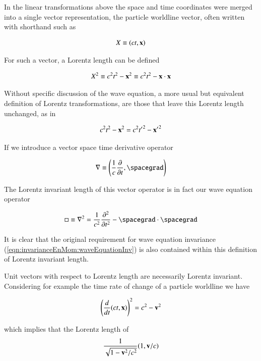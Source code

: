 In the linear transformations above the space and time coordinates were merged into a single vector representation,
the particle worldline vector, often written with shorthand such as

\begin{align}
X \equiv (ct, \mathbf{x})
\end{align}

For such a vector, a Lorentz length can be defined

\begin{align}
X^2 \equiv c^2 t^2 - \mathbf{x}^2 \equiv c^2 t^2 - \mathbf{x} \cdot \mathbf{x}
\end{align}

Without specific discussion of the wave equation, 
a more usual but equivalent definition of Lorentz transformations, are those that leave this
Lorentz length unchanged, as in

\begin{align}
c^2 t^2 - \mathbf{x}^2 = c^2 {t'}^2 - {\mathbf{x}'}^2 
\end{align}

If we introduce a vector space time derivative operator

\begin{align}
\grad \equiv \left(\inv{c}\frac{\partial}{\partial t}, \spacegrad \right)
\end{align}

The Lorentz invariant length of this vector operator is in fact our wave equation operator

\begin{align}
\square \equiv \grad^2 = \inv{c^2}\frac{\partial^2}{\partial t^2} - \spacegrad \cdot \spacegrad
\end{align}

It is clear that the original requirement for wave equation invariance (\ref{eqn:invarianceEnMom:waveEquationInv}) is also contained within 
this definition of Lorentz invariant length.

Unit vectors with respect to Lorentz length are necessarily Lorentz invariant.  Considering for example the time rate of change of
a particle worldline we have

\begin{align}
\left(\frac{d}{dt}(ct, \mathbf{x}) \right)^2 = c^2 - \mathbf{v}^2
\end{align}

which implies that the Lorentz length of
\begin{align}
\frac{1}{\sqrt{1 - \mathbf{v}^2/c^2}}(1, \mathbf{v}/c)
\end{align}

